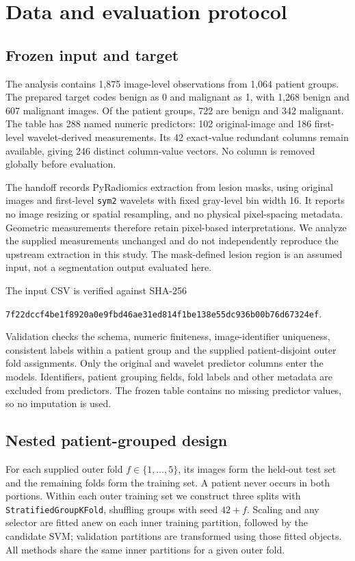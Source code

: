 \documentclass[11pt,a4paper]{article}
\begin{document}
\section{Data and evaluation protocol}
\subsection{Frozen input and target}
The analysis contains 1,875 image-level observations from 1,064 patient groups. The prepared target codes benign as 0 and malignant as 1, with 1,268 benign and 607 malignant images. Of the patient groups, 722 are benign and 342 malignant. The table has 288 named numeric predictors: 102 original-image and 186 first-level wavelet-derived measurements. Its 42 exact-value redundant columns remain available, giving 246 distinct column-value vectors. No column is removed globally before evaluation.

The handoff records PyRadiomics extraction from lesion masks, using original images and first-level \texttt{sym2} wavelets with fixed gray-level bin width 16. It reports no image resizing or spatial resampling, and no physical pixel-spacing metadata. Geometric measurements therefore retain pixel-based interpretations. We analyze the supplied measurements unchanged and do not independently reproduce the upstream extraction in this study. The mask-defined lesion region is an assumed input, not a segmentation output evaluated here.

The input CSV is verified against SHA-256
\begin{center}\small\texttt{7f22dccf4be1f8920a0e9fbd46ae31ed814f1be138e55dc936b00b76d67324ef}.\end{center}
Validation checks the schema, numeric finiteness, image-identifier uniqueness, consistent labels within a patient group and the supplied patient-disjoint outer fold assignments. Only the original and wavelet predictor columns enter the models. Identifiers, patient grouping fields, fold labels and other metadata are excluded from predictors. The frozen table contains no missing predictor values, so no imputation is used.

\subsection{Nested patient-grouped design}
For each supplied outer fold $f\in\{1,\ldots,5\}$, its images form the held-out test set and the remaining folds form the training set. A patient never occurs in both portions. Within each outer training set we construct three splits with \texttt{StratifiedGroupKFold}, shuffling groups with seed $42+f$. Scaling and any selector are fitted anew on each inner training partition, followed by the candidate SVM; validation partitions are transformed using those fitted objects. All methods share the same inner partitions for a given outer fold.
\end{document}
